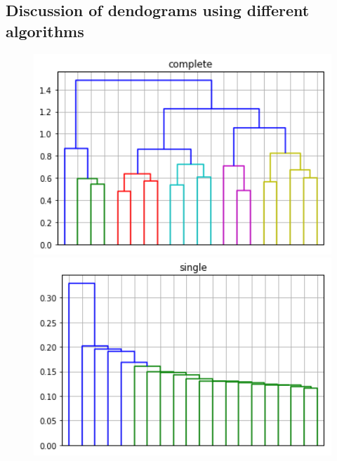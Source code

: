 \subsection{Discussion of dendograms using different algorithms}

\begin{figure}[h]
  \begin{minipage}[h]{.50\textwidth}    
    \includegraphics[width=1\textwidth]{img/ch3/hierarchical_complete}
  \end{minipage}  
  \begin{minipage}[h]{.50\textwidth}    
    \includegraphics[width=1\textwidth]{img/ch3/hierarchical_single}
  \end{minipage}  
\end{figure}


